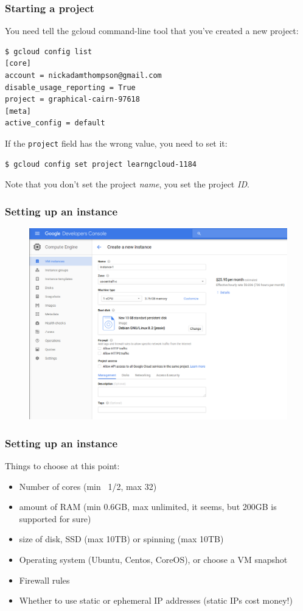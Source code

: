 \documentclass[9pt]{beamer}
\begin{document}
\begin{frame}[fragile]
\frametitle{Starting a project}
You need tell the gcloud command-line tool that you've created a new project:
\begin{verbatim}
$ gcloud config list
[core]
account = nickadamthompson@gmail.com
disable_usage_reporting = True
project = graphical-cairn-97618 
[meta]
active_config = default
\end{verbatim}
If the \texttt{project} field has the wrong value, you need to set it:
\begin{verbatim}
$ gcloud config set project learngcloud-1184
\end{verbatim}
Note that you don't set the project \emph{name}, you set the project \emph{ID}.
\end{frame}


\begin{frame}[fragile]
  \frametitle{Setting up an instance}
  \begin{figure}
    \includegraphics[scale=0.3]{figures/CreateInstance.png}
  \end{figure}
\end{frame}

\begin{frame}[fragile]
  \frametitle{Setting up an instance}
  Things to choose at this point:
  \pause
  \begin{itemize}
  \item Number of cores (min ~1/2, max 32)
    \pause
  \item amount of RAM (min 0.6GB, max unlimited, it seems, but 200GB is supported for sure)
    \pause
  \item size of disk, SSD (max 10TB) or spinning (max 10TB) 
    \pause
  \item Operating system (Ubuntu, Centos, CoreOS), or choose a VM snapshot
    \pause
  \item Firewall rules
    \pause
  \item Whether to use static or ephemeral IP addresses (static IPs cost money!)
  \end{itemize}
\end{frame}
\end{document}
